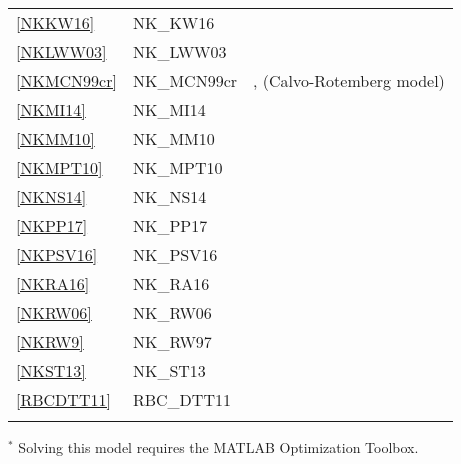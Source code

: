 \documentclass[11pt,a4paper]{article}
\begin{document}
\begin{table}[H]
\begin{tabularx}{\textwidth}{lll}
			\ref{NKKW16} & NK\_KW16 & \cite{kirchner2016fiscal} \\
			\ref{NKLWW03} & NK\_LWW03 & \cite{LevinWielandWilliams2003}   \\
			\ref{NKMCN99cr} & NK\_MCN99cr & \cite{McCallumNelson1999}, (Calvo-Rotemberg model) \\
			\ref{NKMI14} & NK\_MI14 & \cite{michaillat2014atheory} \\
			\ref{NKMM10} & NK\_MM10 & \cite{MehMoran2010} \\
			\ref{NKMPT10} & NK\_MPT10 & \cite{monacelli2010unemployment} \\
			\ref{NKNS14} & NK\_NS14 &  \cite{NakamuraSteinsson2014} \\
			\ref{NKPP17} & NK\_PP17 &  \cite{paoli2017coordinating} \\
			\ref{NKPSV16} & NK\_PSV16 &  \cite{pancrazi2016price} \\
			\ref{NKRA16} & NK\_RA16 &  \cite{rannenberg2016bank} \\
			\ref{NKRW06} & NK\_RW06 & \cite{RavennaWalsh2006} \\
			\ref{NKRW9} & NK\_RW97  & \cite{RotembergWoodford1997} \\
			\ref{NKST13} & NK\_ST13  & \cite{stracca2013inside} \\
			\ref{RBCDTT11} & RBC\_DTT11 & \cite{DeFioreetal2011} \\
			&& \\

			\hline \hline
			
		\end{tabularx}
		\footnotesize \noindent $ ^{\ast}$ Solving this model requires the MATLAB Optimization Toolbox.
		
	\end{table}
	
\end{document}
